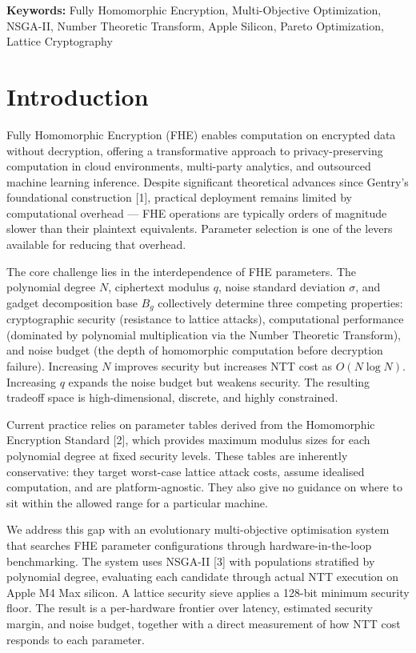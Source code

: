 \textbf{Keywords:} Fully Homomorphic Encryption, Multi-Objective Optimization, NSGA-II, Number Theoretic Transform, Apple Silicon, Pareto Optimization, Lattice Cryptography

\section{Introduction}\label{introduction}

Fully Homomorphic Encryption (FHE) enables computation on encrypted data without decryption, offering a transformative approach to privacy-preserving computation in cloud environments, multi-party analytics, and outsourced machine learning inference. Despite significant theoretical advances since Gentry's foundational construction [1], practical deployment remains limited by computational overhead --- FHE operations are typically orders of magnitude slower than their plaintext equivalents. Parameter selection is one of the levers available for reducing that overhead.

The core challenge lies in the interdependence of FHE parameters. The polynomial degree \(N\), ciphertext modulus \(q\), noise standard deviation \(\sigma\), and gadget decomposition base \(B_g\) collectively determine three competing properties: cryptographic security (resistance to lattice attacks), computational performance (dominated by polynomial multiplication via the Number Theoretic Transform), and noise budget (the depth of homomorphic computation before decryption failure). Increasing \(N\) improves security but increases NTT cost as \(O(N \log N)\). Increasing \(q\) expands the noise budget but weakens security. The resulting tradeoff space is high-dimensional, discrete, and highly constrained.

Current practice relies on parameter tables derived from the Homomorphic Encryption Standard [2], which provides maximum modulus sizes for each polynomial degree at fixed security levels. These tables are inherently conservative: they target worst-case lattice attack costs, assume idealised computation, and are platform-agnostic. They also give no guidance on where to sit within the allowed range for a particular machine.

We address this gap with an evolutionary multi-objective optimisation system that searches FHE parameter configurations through hardware-in-the-loop benchmarking. The system uses NSGA-II [3] with populations stratified by polynomial degree, evaluating each candidate through actual NTT execution on Apple M4 Max silicon. A lattice security sieve applies a 128-bit minimum security floor. The result is a per-hardware frontier over latency, estimated security margin, and noise budget, together with a direct measurement of how NTT cost responds to each parameter.

